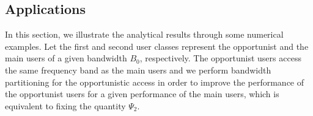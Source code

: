 % 		

\subsection{Applications}
\label{sec:num}

In this section, we illustrate the analytical results through some numerical examples. Let the first and second user classes represent the opportunist and the main users of a given bandwidth $B_0$, respectively.
%
The opportunist users access the same frequency band as the main users and we perform bandwidth partitioning for the opportunistic access in order to improve the performance of the opportunist users for a given performance of the main users, which is equivalent to fixing the quantity $\Psi_2$.

